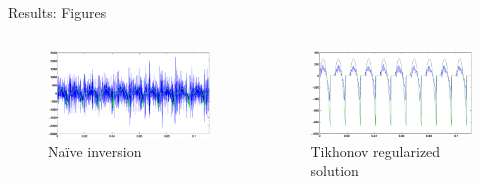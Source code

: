 \documentclass[final]{beamer}
\begin{document}
\begin{frame}[t]
\begin{columns}[t]
\begin{column}{.465\textwidth}

\begin{block}{Results: Figures}


\begin{columns}

\begin{column}{.5\textwidth}
\begin{center}
\begin{figure}
\includegraphics[width=.98\linewidth]{naive_test_nocrime.eps}
\caption{Naïve inversion}
\label{fig:naive}
\end{figure}
\end{center}
\end{column}

\begin{column}{.5\textwidth}
\begin{center}
\begin{figure}
\includegraphics[width=.94\linewidth]{naive_test_nocrime_morozov.eps}
\caption{Tikhonov regularized solution}
\label{fig:naive-tik}
\end{figure}
\end{center}
\end{column}


\end{columns}
\end{block}
\end{column}
\end{columns}
\end{frame}
\end{document}
